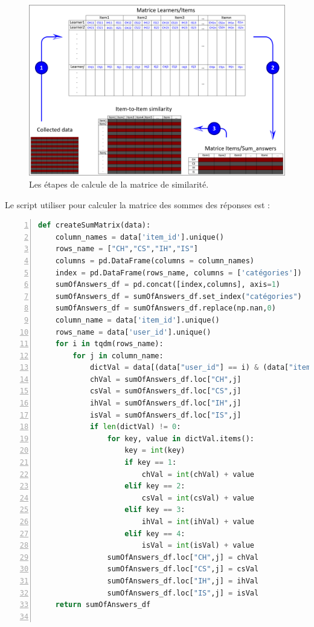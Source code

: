 \begin{figure}[H]
	\begin{center}
		\includegraphics[width=\textwidth]{images/chapitre7/similarity_steps.png}
	\end{center}
	\caption{Les étapes de calcule de la matrice de similarité.}
	\label{similarity_steps}
\end{figure}

Le script utiliser pour calculer la matrice des sommes des réponses est :
\begin{lstlisting}[language=Python,basicstyle=\scriptsize, frame=l,framesep=4.5mm,framexleftmargin=2.5mm,tabsize=2,numbers=left,fillcolor=\color{blueforest!70},rulecolor=\color{blueforest},numberstyle=\normalfont\tiny\color{white}]
	def createSumMatrix(data):
    column_names = data['item_id'].unique()
    rows_name = ["CH","CS","IH","IS"]
    columns = pd.DataFrame(columns = column_names)
    index = pd.DataFrame(rows_name, columns = ['catégories'])
    sumOfAnswers_df = pd.concat([index,columns], axis=1)
    sumOfAnswers_df = sumOfAnswers_df.set_index("catégories")
    sumOfAnswers_df = sumOfAnswers_df.replace(np.nan,0)
    column_name = data['item_id'].unique()
    rows_name = data['user_id'].unique()
    for i in tqdm(rows_name):
        for j in column_name:
            dictVal = data[(data["user_id"] == i) & (data["item_id"] == j)]['answers_using_hint'].value_counts()
            chVal = sumOfAnswers_df.loc["CH",j]
            csVal = sumOfAnswers_df.loc["CS",j]
            ihVal = sumOfAnswers_df.loc["IH",j]
            isVal = sumOfAnswers_df.loc["IS",j]
            if len(dictVal) != 0:
                for key, value in dictVal.items():
                    key = int(key)
                    if key == 1:
                        chVal = int(chVal) + value
                    elif key == 2:
                        csVal = int(csVal) + value
                    elif key == 3:
                        ihVal = int(ihVal) + value
                    elif key == 4:
                        isVal = int(isVal) + value
                sumOfAnswers_df.loc["CH",j] = chVal
                sumOfAnswers_df.loc["CS",j] = csVal
                sumOfAnswers_df.loc["IH",j] = ihVal
                sumOfAnswers_df.loc["IS",j] = isVal
	return sumOfAnswers_df
	
\end{lstlisting}

